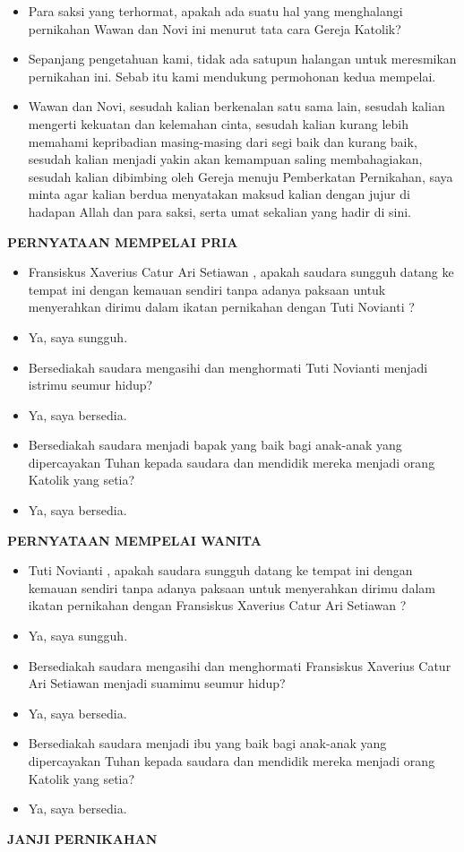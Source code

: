 \documentclass[10pt]{book}
\makeatletter
\newcommand{\subjudul}[1]{%
  {\parindent \z@ \normalfont
    \interlinepenalty\@M \bfseries #1\par\nobreak \vskip 20\p@ }}
\newcommand{\BI}[1]{\begin{itemize} \item[I:] #1 \end{itemize}}
\newcommand{\BL}[1]{\begin{itemize} \item[Wawan:] #1 \end{itemize}}
\newcommand{\BW}[1]{\begin{itemize} \item[Novi:] #1 \end{itemize}}
\newcommand{\BS}[1]{\begin{itemize} \item[Saksi:] #1 \end{itemize}}
\newcommand{\mempelaip}{Fransiskus Xaverius Catur Ari Setiawan }
\newcommand{\mempelaiw}{Tuti Novianti }
\makeatother
\begin{document}
\BI{Para saksi yang terhormat, apakah ada suatu hal yang menghalangi pernikahan Wawan dan Novi ini menurut tata cara Gereja Katolik?} 

\BS{Sepanjang pengetahuan kami, tidak ada satupun halangan untuk meresmikan pernikahan ini. Sebab itu kami mendukung permohonan kedua mempelai.}

\BI{Wawan dan Novi, sesudah kalian berkenalan satu sama lain, sesudah kalian mengerti kekuatan dan kelemahan cinta, sesudah kalian kurang lebih memahami kepribadian masing-masing dari segi baik dan kurang baik, sesudah kalian menjadi yakin akan kemampuan saling membahagiakan, sesudah kalian dibimbing oleh Gereja menuju Pemberkatan Pernikahan, saya minta agar kalian berdua menyatakan maksud kalian dengan jujur di hadapan Allah dan para saksi, serta umat sekalian yang hadir di sini.}


\subjudul{PERNYATAAN MEMPELAI PRIA}

\BI{\mempelaip , apakah saudara sungguh datang ke tempat ini dengan kemauan sendiri tanpa adanya paksaan untuk menyerahkan dirimu dalam ikatan pernikahan dengan \mempelaiw ?}

\BL{Ya, saya sungguh.}

\BI{Bersediakah saudara mengasihi dan menghormati  \mempelaiw menjadi istrimu seumur hidup?}

\BL{Ya, saya bersedia.}

\BI{Bersediakah saudara menjadi bapak yang baik bagi anak-anak yang dipercayakan Tuhan kepada saudara dan mendidik mereka menjadi orang Katolik yang setia?}

\BL{Ya, saya bersedia.}


\subjudul{PERNYATAAN MEMPELAI WANITA}

\BI{\mempelaiw, apakah saudara sungguh datang ke tempat ini dengan kemauan sendiri tanpa adanya paksaan untuk menyerahkan dirimu dalam ikatan pernikahan dengan \mempelaip?}

\BW{Ya, saya sungguh.}

\BI{Bersediakah saudara mengasihi dan menghormati  \mempelaip menjadi suamimu seumur hidup?}

\BW{Ya, saya bersedia.}

\BI{Bersediakah saudara menjadi ibu yang baik bagi anak-anak yang dipercayakan Tuhan kepada saudara dan mendidik mereka menjadi orang Katolik yang setia?}

\BW{Ya, saya bersedia.}




\subjudul{JANJI PERNIKAHAN}
\end{document}

